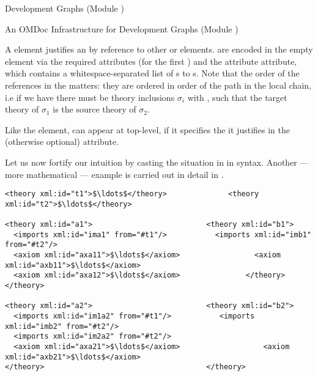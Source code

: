\begin{omgroup}[id=complex-theories,short=Complex Theories,
                            creators=miko,contributors=frabe]
\begin{omgroup}[id=development-graphs,short=Development Graphs]{Development Graphs (Module
  {})}
\begin{module}[id=dgraph]
\begin{omgroup}[id=dg-omdoc,short=OMDoc Development Graphs]{An OMDoc Infrastructure for
  Development Graphs (Module {})}
\begin{definition}[id=path-just.def]
  A {} element justifies an {} by reference to
  other {} or {}
  elements.  are encoded in the empty
  {} element via the required attributes {}
  (for the first {}) and the attribute
  {} attribute, which contains a whitespace-separated list
  of {s} to {s}. Note that the order of
  the references in the {} matters: they are ordered
  in order of the path in the local chain, i.e if we have {} there must be theory inclusions $\sigma_i$ with
  {}, such that the target theory of $\sigma_1$ is the source
  theory of $\sigma_2$.
\end{definition}

Like the {} element, {} can appear at top-level,
if it specifies the {} it justifies in the (otherwise optional)
{} attribute.

Let us now fortify our intuition by casting the situation in {}
in {\omdoc} syntax. Another --- more mathematical --- example is carried out in detail in
{}.

\begin{lstlisting}[label=lst:thi,mathescape,
                   index={theory,imports,axiom},
                   caption={The {\omdoc} representation of the theories
                   in {\myfigref{thi-proof}}.}]
<theory xml:id="t1">$\ldots$</theory>              <theory xml:id="t2">$\ldots$</theory> 

<theory xml:id="a1">                          <theory xml:id="b1">
  <imports xml:id="ima1" from="#t1"/>           <imports xml:id="imb1" from="#t2"/>
  <axiom xml:id="axa11">$\ldots$</axiom>                 <axiom xml:id="axb11">$\ldots$</axiom>
  <axiom xml:id="axa12">$\ldots$</axiom>               </theory>
</theory>

<theory xml:id="a2">                          <theory xml:id="b2">
  <imports xml:id="im1a2" from="#t1"/>           <imports xml:id="imb2" from="#t2"/>
  <imports xml:id="im2a2" from="#t2"/> 
  <axiom xml:id="axa21">$\ldots$</axiom>                   <axiom xml:id="axb21">$\ldots$</axiom>
</theory>                                     </theory>


\end{lstlisting}
\end{omgroup}
\end{module}
\end{omgroup}
\end{omgroup}
